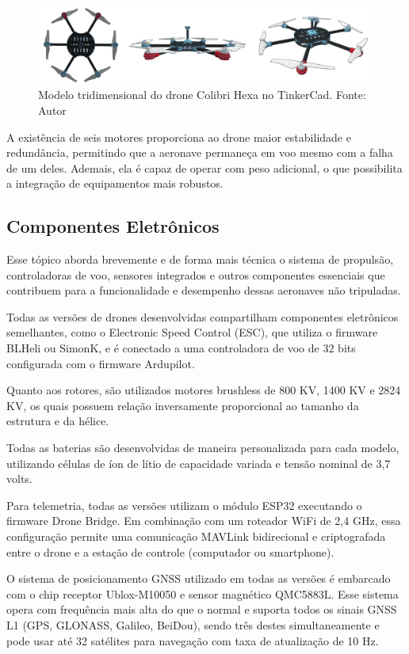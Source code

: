 \documentclass[conference]{IEEEtran}
\begin{document}
\begin{figure}[!htb]
    \centering
    \includegraphics[scale=0.14]{img/Colibri-hexa.png} 
    \caption{Modelo tridimensional do drone Colibri Hexa no TinkerCad. Fonte: Autor}
    \label{fig:my_label}
\end{figure}

A existência de seis motores proporciona ao drone maior estabilidade e redundância, permitindo que a aeronave permaneça em voo mesmo com a falha de um deles. Ademais, ela é capaz de operar com peso adicional, o que possibilita a integração de equipamentos mais robustos.

\subsection{Componentes Eletrônicos}

Esse tópico aborda brevemente e de forma mais técnica o sistema de propulsão, controladoras de voo, sensores integrados e outros componentes essenciais que contribuem para a funcionalidade e desempenho dessas aeronaves não tripuladas.

Todas as versões de drones desenvolvidas compartilham componentes eletrônicos semelhantes, como o Electronic Speed Control (ESC), que utiliza o firmware BLHeli ou SimonK, e é conectado a uma controladora de voo de 32 bits configurada com o firmware Ardupilot.

Quanto aos rotores, são utilizados motores brushless de 800 KV, 1400 KV e 2824 KV, os quais possuem relação inversamente proporcional ao tamanho da estrutura e da hélice.

Todas as baterias são desenvolvidas de maneira personalizada para cada modelo, utilizando células de íon de lítio de capacidade variada e tensão nominal de 3,7 volts.

Para telemetria, todas as versões utilizam o módulo ESP32 executando o firmware Drone Bridge. Em combinação com um roteador WiFi de 2,4 GHz, essa configuração permite uma comunicação MAVLink bidirecional e criptografada entre o drone e a estação de controle (computador ou smartphone).

O sistema de posicionamento GNSS utilizado em todas as versões é embarcado com o chip receptor Ublox-M10050 e sensor magnético QMC5883L. Esse sistema opera com frequência mais alta do que o normal e suporta todos os sinais GNSS L1 (GPS, GLONASS, Galileo, BeiDou), sendo três destes simultaneamente e pode usar até 32 satélites para navegação com taxa de atualização de 10 Hz.
\end{document}
